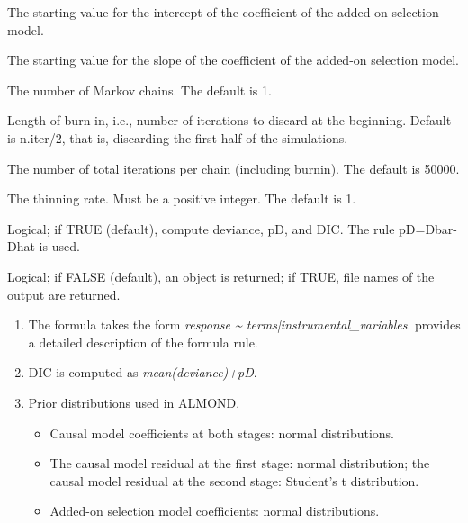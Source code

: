 \documentclass[a4paper]{book}
\begin{document}
\begin{Arguments}
\begin{ldescription}
\item[\code{lambda0.start}] The starting value for the intercept of the coefficient of the added-on selection model.

\item[\code{lambda1.start}] The starting value for the slope of the coefficient of the added-on selection model.

\item[\code{n.chains}] The number of Markov chains. The default is 1.

\item[\code{n.burnin}] Length of burn in, i.e., number of iterations to discard at the beginning.
Default is n.iter/2, that is, discarding the first half of the simulations.

\item[\code{n.iter}] The number of total iterations per chain (including burnin). The default is 50000.

\item[\code{n.thin}] The thinning rate. Must be a positive integer. The default is 1.

\item[\code{DIC}] Logical; if TRUE (default), compute deviance, pD, and DIC. The rule pD=Dbar-Dhat is used.

\item[\code{codaPkg}] Logical; if FALSE (default), an object is returned; if TRUE,
file names of the output are returned.
\end{ldescription}
\end{Arguments}
%
\begin{Details}\relax
\begin{enumerate}

\item The formula takes the form \emph{response \textasciitilde{} terms|instrumental\_variables}.
 provides a detailed description of the formula rule.
\item DIC is computed as \emph{mean(deviance)+pD}.
\item Prior distributions used in ALMOND.
\begin{itemize}

\item Causal model coefficients at both stages: normal distributions.
\item The causal model residual at the first stage: normal distribution;
the causal model residual at the second stage: Student's t distribution.
\item Added-on selection model coefficients: normal distributions.

\end{itemize}


\end{enumerate}

\end{Details}
\end{document}
